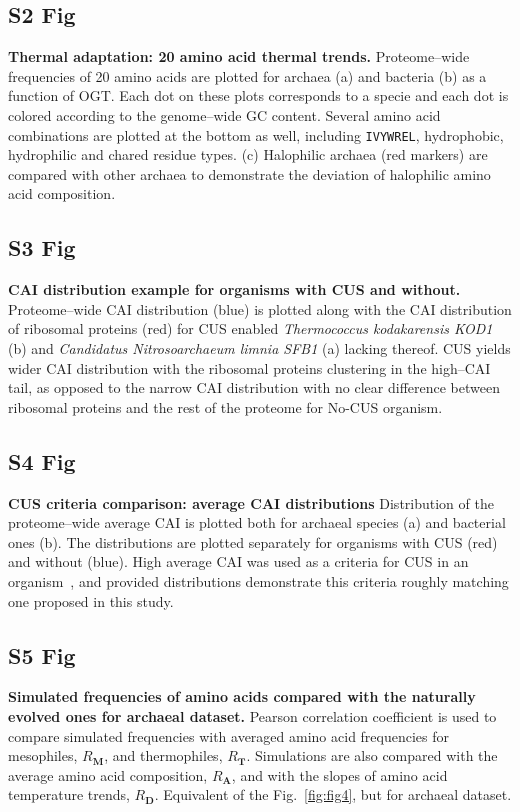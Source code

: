 \documentclass[10pt,letterpaper]{article}
\begin{document}
\subsection*{S2 Fig}
\label{fig:s2}
{\bf Thermal adaptation: 20 amino acid thermal trends. }
Proteome--wide frequencies of 20 amino acids are plotted for archaea (a) and bacteria (b) as a function of OGT. Each dot on these plots corresponds to a specie and each dot is colored according to the genome--wide GC content. Several amino acid combinations are plotted at the bottom as well, including \texttt{IVYWREL}, hydrophobic, hydrophilic and chared residue types. (c) Halophilic archaea (red markers) are compared with other archaea to demonstrate the deviation of halophilic amino acid composition.



\subsection*{S3 Fig}
\label{fig:s3}
{\bf CAI distribution example for organisms with CUS and without.}
Proteome--wide CAI distribution (blue) is plotted along with the CAI distribution of ribosomal proteins (red) for CUS enabled {\it Thermococcus kodakarensis KOD1} (b) and {\it Candidatus Nitrosoarchaeum limnia SFB1} (a) lacking thereof. CUS yields wider CAI distribution with the ribosomal proteins clustering in the high--CAI tail, as opposed to the narrow CAI distribution with no clear difference between ribosomal proteins and the rest of the proteome for No-CUS organism.


\subsection*{S4 Fig}
\label{fig:s4}
{\bf CUS criteria comparison: average CAI distributions}
Distribution of the proteome--wide average CAI is plotted both for archaeal species (a) and bacterial ones (b). 
The distributions are plotted separately for organisms with CUS (red) and without (blue). High average CAI was used as a criteria for CUS in an organism~\cite{Botzman2011Variation}, and provided distributions demonstrate this criteria roughly matching one proposed in this study.


\subsection*{S5 Fig}
\label{fig:s5}
{\bf Simulated frequencies of amino acids compared with the naturally evolved ones for archaeal dataset.} Pearson correlation coefficient is used to compare simulated frequencies with averaged amino acid frequencies for mesophiles, $R_{\mathbf{M}}$, and thermophiles, $R_{\mathbf{T}}$. Simulations are also compared with the average amino acid composition, $R_{\mathbf{A}}$, and with the slopes of amino acid temperature trends, $R_{\mathbf{D}}$. Equivalent of the Fig.~\ref{fig:fig4}, but for archaeal dataset.
\end{document}
